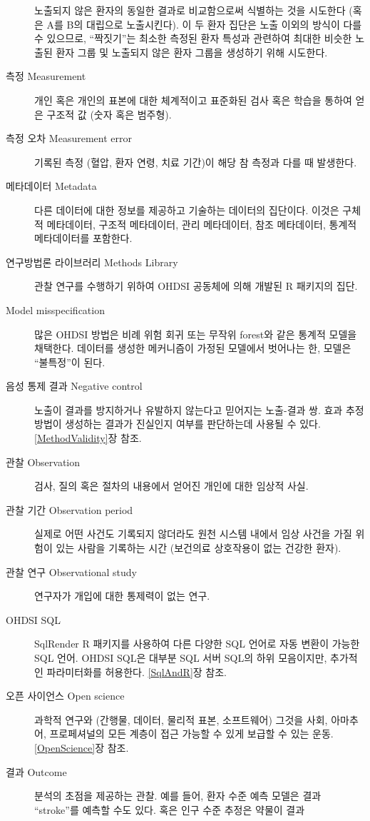 \documentclass[10.5pt]{book}
\theoremstyle{definition}
\theoremstyle{definition}
\theoremstyle{definition}
\theoremstyle{remark}
\begin{document}
\begin{description}
노출되지 않은 환자의 동일한 결과로 비교함으로써 식별하는 것을 시도한다
(혹은 A를 B의 대립으로 노출시킨다). 이 두 환자 집단은 노출 이외의 방식이
다를 수 있으므로, ``짝짓기''는 최소한 측정된 환자 특성과 관련하여 최대한
비슷한 노출된 환자 그룹 및 노출되지 않은 환자 그룹을 생성하기 위해
시도한다.
\item[측정 Measurement]
개인 혹은 개인의 표본에 대한 체계적이고 표준화된 검사 혹은 학습을 통하여
얻은 구조적 값 (숫자 혹은 범주형).
\item[측정 오차 Measurement error]
기록된 측정 (혈압, 환자 연령, 치료 기간)이 해당 참 측정과 다를 때
발생한다.
\item[메타데이터 Metadata]
다른 데이터에 대한 정보를 제공하고 기술하는 데이터의 집단이다. 이것은
구체적 메타데이터, 구조적 메타데이터, 관리 메타데이터, 참조 메타데이터,
통계적 메타데이터를 포함한다.
\item[연구방법론 라이브러리 Methods Library]
관찰 연구를 수행하기 위하여 OHDSI 공동체에 의해 개발된 R 패키지의 집단.
\item[Model misspecification]
많은 OHDSI 방법은 비례 위험 회귀 또는 무작위 forest와 같은 통계적 모델을
채택한다. 데이터를 생성한 메커니즘이 가정된 모델에서 벗어나는 한, 모델은
``불특정''이 된다.
\item[음성 통제 결과 Negative control]
노출이 결과를 방지하거나 유발하지 않는다고 믿어지는 노출-결과 쌍. 효과
추정 방법이 생성하는 결과가 진실인지 여부를 판단하는데 사용될 수 있다.
\ref{MethodValidity}장 참조.
\item[관찰 Observation]
검사, 질의 혹은 절차의 내용에서 얻어진 개인에 대한 임상적 사실.
\item[관찰 기간 Observation period]
실제로 어떤 사건도 기록되지 않더라도 원천 시스템 내에서 임상 사건을 가질
위험이 있는 사람을 기록하는 시간 (보건의료 상호작용이 없는 건강한 환자).
\item[관찰 연구 Observational study]
연구자가 개입에 대한 통제력이 없는 연구.
\item[OHDSI SQL]
SqlRender R 패키지를 사용하여 다른 다양한 SQL 언어로 자동 변환이 가능한
SQL 언어. OHDSI SQL은 대부분 SQL 서버 SQL의 하위 모음이지만, 추가적인
파라미터화를 허용한다. \ref{SqlAndR}장 참조.
\item[오픈 사이언스 Open science]
과학적 연구와 (간행물, 데이터, 물리적 표본, 소프트웨어) 그것을 사회,
아마추어, 프로페셔널의 모든 계층이 접근 가능할 수 있게 보급할 수 있는
운동. \ref{OpenScience}장 참조.
\item[결과 Outcome]
분석의 초점을 제공하는 관찰. 예를 들어, 환자 수준 예측 모델은 결과
``stroke''를 예측할 수도 있다. 혹은 인구 수준 추정은 약물이 결과

\end{description}
\end{document}

